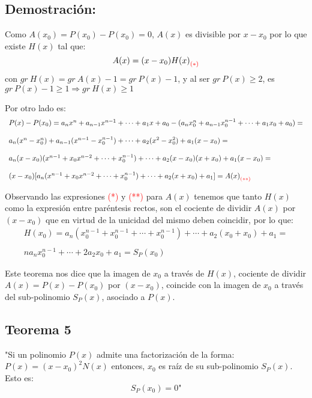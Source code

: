 \documentclass[12pt]{article}
\begin{document}
\subsection*{Demostración:}
Como $A({x}_0)=P({x}_0)-P({x}_0)=0$, $A(x)$ es divisible por $x-{x}_0$ por lo que existe $H(x)$ tal que:
$$
  A(x)=(x-{x}_0){H(x)}_{\textcolor{red}{(*)}}
$$
con $gr \ H(x)=gr \ A(x)-1=gr \ P(x)-1$, y al ser $gr \ P(x) \geqslant 2$, es $gr \ P(x)-1 \geqslant 1 \Rightarrow gr \ H(x) \geqslant 1$

Por otro lado es:
$$
  \begin{array}{lll}
    P(x)-P({x}_0)={a}_n x^n+{a}_{n-1} x^{n-1}+\cdots+{a}_1 x+{a}_0-({a}_n {x}_0^n+{a}_{n-1} {x}_0^{n-1}+\cdots+{a}_1{x}_0+{a}_0)= \\
    \\
    {a}_n(x^n-{x}_0^n)+{a}_{n-1}(x^{n-1}-{x}_0^{n-1})+\cdots+{a}_2(x^2-{x}_0^2)+{a}_1(x-{x}_0)=                                   \\
    \\
    {a}_n(x-{x}_0)(x^{n-1}+{x}_0 x^{n-2}+\cdots+{x}_0^{n-1})+\cdots+{a}_2(x-{x}_0)(x+{x}_0)+{a}_1(x-{x}_0)=                       \\
    \\
    (x-{x}_0)[{a}_n(x^{n-1}+{x}_0 x^{n-2}+\cdots+{x}_0^{n-1})+\cdots+{a}_2(x+{x}_0)+{a}_1]={A(x)}_{\textcolor{red}{(**)}}
  \end{array}
$$


Observando las expresiones \textcolor{red}{(*)} y \textcolor{red}{(**)} para $A(x)$ tenemos que tanto $H(x)$ como la expresión entre paréntesis rectos, son el cociente de dividir $A(x)$ por $(x-{x}_0)$ que en virtud de la unicidad del mismo deben coincidir, por lo que:
$$
  \begin{array}{ccc}
    H({x}_0)={a}_n({x}_0^{n-1}+{x}_0^{n-1}+\cdots+{x}_0^{n-1})+\cdots+{a}_2({x}_0+{x}_0)+{a}_1= \\
    \\
    n{a}_n {x}_0^{n-1}+\cdots+2{a}_2 {x}_0+{a}_1= {S}_P({x}_0)
  \end{array}
$$

Este teorema nos dice que la imagen de ${x}_0$ a través de $H(x)$, cociente de dividir $A(x)=P(x)-P({x}_0)$ por $(x-{x}_0)$, coincide con la imagen de ${x}_0$ a través del sub-polinomio ${S}_P(x)$, asociado a $P(x)$.

\subsection{
  Teorema 5
}
"Si un polinomio $P(x)$ admite una factorización de la forma:
$P(x)=(x-{x}_0)^2 N(x)$
entonces, ${x}_0$ es raíz de su sub-polinomio ${S}_P(x)$.
Esto es:
$$
  {S}_P({x}_0)=0\text{"}
$$
\end{document}

